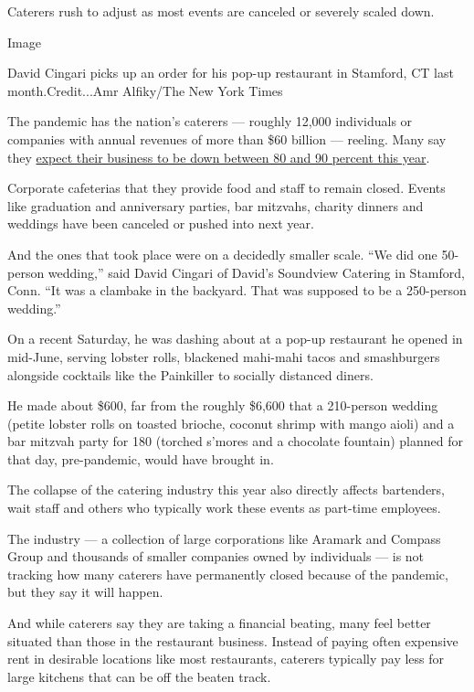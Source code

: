 Caterers rush to adjust as most events are canceled or severely scaled
down.

Image

David Cingari picks up an order for his pop-up restaurant in Stamford,
CT last month.Credit...Amr Alfiky/The New York Times

The pandemic has the nation's caterers --- roughly 12,000 individuals or
companies with annual revenues of more than \$60 billion --- reeling.
Many say they
\href{https://www.nytimes3xbfgragh.onion/2020/08/04/business/coronavirus-struggling-caterers.html}{expect
their business to be down between 80 and 90 percent this year}.

Corporate cafeterias that they provide food and staff to remain closed.
Events like graduation and anniversary parties, bar mitzvahs, charity
dinners and weddings have been canceled or pushed into next year.

And the ones that took place were on a decidedly smaller scale. ``We did
one 50-person wedding,'' said David Cingari of David's Soundview
Catering in Stamford, Conn. ``It was a clambake in the backyard. That
was supposed to be a 250-person wedding.''

On a recent Saturday, he was dashing about at a pop-up restaurant he
opened in mid-June, serving lobster rolls, blackened mahi-mahi tacos and
smashburgers alongside cocktails like the Painkiller to socially
distanced diners.

He made about \$600, far from the roughly \$6,600 that a 210-person
wedding (petite lobster rolls on toasted brioche, coconut shrimp with
mango aioli) and a bar mitzvah party for 180 (torched s'mores and a
chocolate fountain) planned for that day, pre-pandemic, would have
brought in.

The collapse of the catering industry this year also directly affects
bartenders, wait staff and others who typically work these events as
part-time employees.

The industry --- a collection of large corporations like Aramark and
Compass Group and thousands of smaller companies owned by individuals
--- is not tracking how many caterers have permanently closed because of
the pandemic, but they say it will happen.

And while caterers say they are taking a financial beating, many feel
better situated than those in the restaurant business. Instead of paying
often expensive rent in desirable locations like most restaurants,
caterers typically pay less for large kitchens that can be off the
beaten track.

